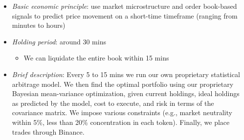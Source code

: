 \documentclass[11pt, letterpaper]{article}
\providecommand{\tightlist}{%
\setlength{\itemsep}{0pt}
\setlength{\parskip}{0pt}}
\begin{document}
\begin{itemize}
    \item \emph{Basic economic principle}: use market microstructure and
      order book-based signals to predict price movement on a short-time
      timeframe (ranging from minutes to hours)

    \item \emph{Holding period}: around 30 mins

      \begin{itemize}
        \tightlist

        \item We can liquidate the entire book within 15 mins
      \end{itemize}

    \item \emph{Brief description}: Every 5 to 15 mins we run our own proprietary
      statistical arbitrage model. We then find the optimal portfolio
      using our proprietary Bayesian mean-variance optimization, given current
      holdings, ideal holdings as predicted by the model, cost to execute,
      and risk in terms of the covariance matrix. We impose various constraints
      (e.g., market neutrality within 5\%, less than 20\% concentration in
      each token). Finally, we place trades through Binance.
  \end{itemize}
\end{document}
